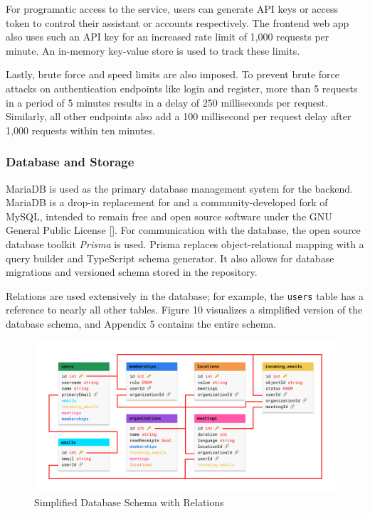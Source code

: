 \documentclass{article}
\begin{document}
For programatic access to the service, users can generate API keys or access token to control their assistant or accounts respectively. The frontend web app also uses such an API key for an increased rate limit of 1,000 requests per minute. An in-memory key-value store is used to track these limits.

Lastly, brute force and speed limits are also imposed. To prevent brute force attacks on authentication endpoints like login and register, more than 5 requests in a period of 5 minutes results in a delay of 250 milliseconds per request. Similarly, all other endpoints also add a 100 millisecond per request delay after 1,000 requests within ten minutes.

\subsubsection{Database and Storage}

MariaDB is used as the primary database management system for the backend. MariaDB is a drop-in replacement for and a community-developed fork of MySQL, intended to remain free and open source software under the GNU General Public License []. For communication with the database, the open source database toolkit \emph{Prisma} is used. Prisma replaces object-relational mapping with a query builder and TypeScript schema generator. It also allows for database migrations and versioned schema stored in the repository.

Relations are used extensively in the database; for example, the \texttt{users} table has a reference to nearly all other tables. Figure 10 visualizes a simplified version of the database schema, and Appendix 5 contains the entire schema.

\begin{figure}
	\includegraphics[width=\textwidth]{database-basic.png}
	\caption{Simplified Database Schema with Relations}
\end{figure}
\end{document}
